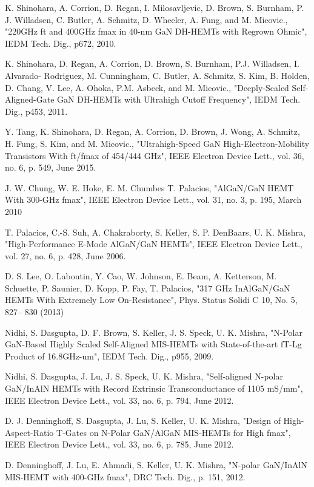 \documentclass[journal]{IEEEtran}
\begin{document}
\begin{thebibliography}{00}
 K. Shinohara, A. Corrion, D. Regan, I. Milosavljevic, D. Brown, S. Burnham, P. J. Willadsen, C. Butler, A. Schmitz, D. Wheeler, A. Fung, and M. Micovic., "220GHz ft and 400GHz fmax in 40-nm GaN DH-HEMTs with Regrown Ohmic", IEDM Tech. Dig., p672, 2010.

 K. Shinohara, D. Regan, A. Corrion, D. Brown, S. Burnham, P.J. Willadsen, I. Alvarado- Rodriguez, M. Cunningham, C. Butler, A. Schmitz, S. Kim, B. Holden, D. Chang, V. Lee, A. Ohoka, P.M. Asbeck, and M. Micovic., "Deeply-Scaled Self-Aligned-Gate GaN DH-HEMTs with Ultrahigh Cutoff Frequency", IEDM Tech. Dig., p453, 2011.

 Y. Tang, K. Shinohara, D. Regan, A. Corrion, D. Brown, J. Wong, A. Schmitz, H. Fung, S. Kim, and M. Micovic., "Ultrahigh-Speed GaN High-Electron-Mobility Transistors With ft/fmax of 454/444 GHz",  IEEE Electron Device Lett., vol. 36, no. 6, p. 549, June 2015.

 J. W. Chung, W. E. Hoke, E. M. Chumbes T. Palacios, "AlGaN/GaN HEMT With 300-GHz fmax",  IEEE Electron Device Lett., vol. 31, no. 3, p. 195, March 2010

 T. Palacios, C.-S. Suh, A. Chakraborty, S. Keller, S. P. DenBaars, U. K. Mishra, "High-Performance E-Mode AlGaN/GaN HEMTs", IEEE Electron Device Lett., vol. 27, no. 6, p. 428, June 2006.

 D. S. Lee, O. Laboutin, Y. Cao, W. Johnson, E. Beam, A. Ketterson, M. Schuette, P. Saunier, D. Kopp, P. Fay, T. Palacios, "317 GHz InAlGaN/GaN HEMTs With Extremely Low On-Resistance", Phys. Status Solidi C 10, No. 5, 827– 830 (2013)

 Nidhi, S. Dasgupta, D. F. Brown, S. Keller, J. S. Speck, U. K. Mishra, "N-Polar GaN-Based Highly Scaled Self-Aligned MIS-HEMTs with State-of-the-art fT-Lg Product of 16.8GHz-um", IEDM Tech. Dig., p955, 2009.

 Nidhi, S. Dasgupta, J. Lu, J. S. Speck, U. K. Mishra, "Self-aligned N-polar GaN/InAlN HEMTs with Record Extrinsic Transconductance of 1105 mS/mm",  IEEE Electron Device Lett., vol. 33, no. 6, p. 794, June 2012.

 D. J. Denninghoff, S. Dasgupta, J. Lu, S. Keller, U. K. Mishra, "Design of High-Aspect-Ratio T-Gates on N-Polar GaN/AlGaN MIS-HEMTs for High fmax",  IEEE Electron Device Lett., vol. 33, no. 6, p. 785, June 2012.

 D. Denninghoff, J. Lu, E. Ahmadi, S. Keller, U. K. Mishra, "N-polar GaN/InAlN MIS-HEMT with 400-GHz fmax", DRC Tech. Dig., p. 151, 2012.


\end{thebibliography}
\end{document}
